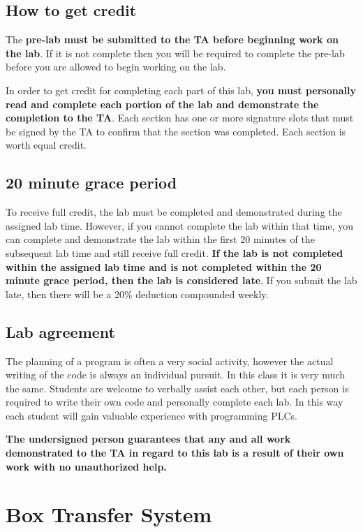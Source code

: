 \subsection{How to get credit}
The \textbf{pre-lab must be submitted to the TA before beginning work on the lab}. If it is not complete then you will be required to complete the pre-lab before you are allowed to begin working on the lab.

In order to get credit for completing each part of this lab, \textbf{you must personally read and complete each portion of the lab and demonstrate the completion to the TA}. Each section has one or more signature slots that must be signed by the TA to confirm that the section was completed. Each section is worth equal credit. 

\subsection{20 minute grace period}
To receive full credit, the lab must be completed and demonstrated during the assigned lab time. However, if you cannot complete the lab within that time, you can complete and demonstrate the lab within the first 20 minutes of the subsequent lab time and still receive full credit. \textbf{If the lab is not completed within the assigned lab time and is not completed within the 20 minute grace period, then the lab is considered late}. If you submit the lab late, then there will be a 20\% deduction compounded weekly.


\subsection{Lab agreement}

The planning of a program is often a very social activity, however the actual writing of the code is always an individual pursuit. In this class it is very much the same. Students are welcome to verbally assist each other, but each person is required to write their own code and personally complete each lab. In this way each student will gain valuable experience with programming PLCs. 

\textbf{The undersigned person guarantees that any and all work demonstrated to the TA in regard to this lab is a result of their own work with no unauthorized help.}




\section{Box Transfer System}

